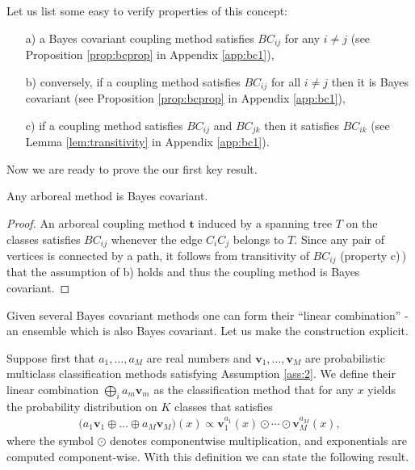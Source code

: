Let us list some easy to verify properties of this concept:

\begin{itemize}
	\item[a)] a Bayes covariant coupling method satisfies $BC_{ij}$ for any $i\not= j$ (see Proposition \ref{prop:bcprop} in Appendix \ref{app:bc1}),
	\item[b)] conversely, if a coupling method satisfies $BC_{ij}$ for all $i\not= j$ then it is Bayes covariant (see Proposition \ref{prop:bcprop} in Appendix \ref{app:bc1}),
	\item[c)] if a coupling method satisfies $BC_{ij}$ and $BC_{jk}$ then it satisfies $BC_{ik}$ (see Lemma \ref{lem:transitivity} in Appendix \ref{app:bc1}).
\end{itemize}

Now we are ready to prove the our first key result.

\begin{prop}
Any arboreal method is Bayes covariant.
\end{prop}
\begin{proof}

An arboreal coupling method $\boldsymbol{t}$ induced by a spanning tree $T$ on the classes satisfies $BC_{ij}$ whenever the edge $C_iC_j$ belongs to $T$. Since any pair of vertices is connected by a path, it follows from transitivity of $BC_{ij}$ (property c)\,) that the assumption of b) holds and thus the coupling method is Bayes covariant.
	
\end{proof}

Given several Bayes covariant methods one can form  their ``linear combination'' - an ensemble which is also Bayes covariant. Let us make the construction explicit.

Suppose first that $a_1, \ldots,a_M$ are real numbers and $\boldsymbol{v}_1, \ldots, \boldsymbol{v}_M$ are probabilistic multiclass classification methods satisfying Assumption \ref{ass:2}. We define their linear combination $\bigoplus_i a_m \boldsymbol{v}_m$ as the classification method that for any $x$ yields the probability distribution on $K$ classes that satisfies
\begin{align*}
 	\bigl(a_1 \boldsymbol{v}_1 \oplus \ldots \oplus a_M \boldsymbol{v}_M\bigr)(x) \propto \boldsymbol{v}_1^{a_1}(x) \odot \cdots \odot \boldsymbol{v}_M^{a_M}(x),
\end{align*}
where the symbol $\odot$ denotes componentwise multiplication, and exponentials are computed component-wise. With this definition we can state the following result.

